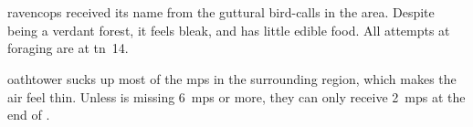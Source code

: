 \section{}
\label{ravencops}

\Gls{ravencops} received its name from the guttural bird-calls in the area.
Despite being a verdant forest, it feels bleak, and has little edible food.
All attempts at \gls{foraging} are at \gls{tn}~14.

\Gls{oathtower} sucks up most of the \glspl{mp} in the surrounding \gls{region}, which makes the air feel thin.
Unless  is missing 6~\glspl{mp} or more, they can only receive 2~\glspl{mp} at the end of .%



